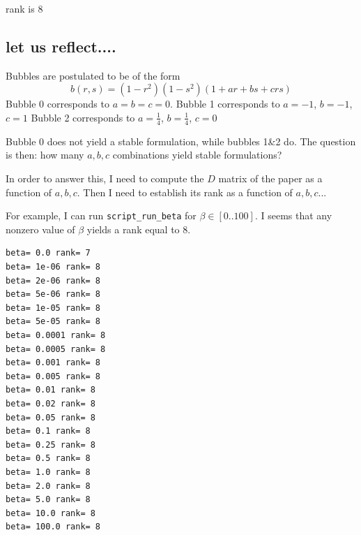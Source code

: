 rank is 8


\newpage
\subsection*{let us reflect....}

Bubbles are postulated to be of the form
\[
b(r,s) = (1-r^2)(1-s^2) (1 + ar + bs + crs  )
\]
Bubble 0 corresponds to $a=b=c=0$. 
Bubble 1 corresponds to $a=-1$, $b=-1$, $c=1$
Bubble 2 corresponds to $a=\frac14$, $b=\frac14$, $c=0$

Bubble 0 does not yield a stable formulation, while bubbles 1\&2 do. 
The question is then: how many $a,b,c$ combinations yield stable formulations?

In order to answer this, I need to compute the $D$ matrix of the paper
as a function of $a,b,c$. Then I need to establish its rank as a function of $a,b,c$...

For example, I can run {\tt script\_run\_beta} for $\beta\in [0..100]$. 
I seems that any nonzero value of $\beta$ yields a rank equal to 8.
\begin{verbatim}
beta= 0.0 rank= 7
beta= 1e-06 rank= 8
beta= 2e-06 rank= 8
beta= 5e-06 rank= 8
beta= 1e-05 rank= 8
beta= 5e-05 rank= 8
beta= 0.0001 rank= 8
beta= 0.0005 rank= 8
beta= 0.001 rank= 8
beta= 0.005 rank= 8
beta= 0.01 rank= 8
beta= 0.02 rank= 8
beta= 0.05 rank= 8
beta= 0.1 rank= 8
beta= 0.25 rank= 8
beta= 0.5 rank= 8
beta= 1.0 rank= 8
beta= 2.0 rank= 8
beta= 5.0 rank= 8
beta= 10.0 rank= 8
beta= 100.0 rank= 8
\end{verbatim}


